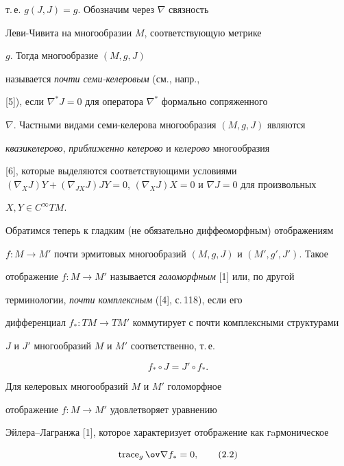 т.\,е. $g(J,J)=g$. Обозначим через $\nabla$ связность 


Леви-Чивита на многообразии $M$, соответствующую метрике


$g$. Тогда многообразие $(M,g,J)$


называется {\it почти семи-келеровым} (см., напр.,


[5]), если $\nabla ^*J=0$ для оператора $\nabla ^*$ формально сопряженного


$\nabla$. Частными видами семи-келерова многообразия $(M,g,J)$ являются


{\it квазикелерово}, {\it приближенно келерово} и {\it келерово} многообразия


[6], которые выделяются  соответствующими условиями $(\nabla _X J)Y+


(\nabla _{JX} J)JY=0$, $(\nabla _X J)X=0$ и $\nabla J=0$ для произвольных


$X,Y \in C^\infty TM$.





Обратимся теперь к гладким (не обязательно диффеоморфным) отображениям


$f{:}M \to M'$ почти эрмитовых многообразий $(M,g,J)$ и $(M',g',J')$. Такое


отображение $f:M \to M'$ называется {\it голоморфным} [1] или, по другой


терминологии, {\it почти комплексным} ([4], с.\,118), если его


дифференциал $f_*:TM \to TM'$ коммутирует с почти комплексными структурами


$J$ и $J'$ многообразий $M$ и $M'$ соответственно, т.\,е.


\begin{equation}


f_* \circ J=J'\circ f_*. \tag{2.1}


\end{equation}





Для келеровых многообразий $M$ и $M'$ голоморфное


отображение $f:M \to M'$ удовлетворяет уравнению


Эйлера--Лагранжа [1], которое характеризует отображение как гaрмоническое


\begin{equation}


\trace_g \ov \nabla f_*=0, \tag{2.2}


\end{equation}


